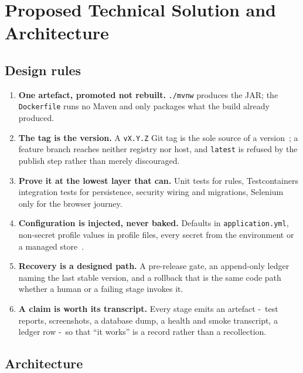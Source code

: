 \documentclass[10pt,a4paper]{article}
\begin{document}
\section{Proposed Technical Solution and Architecture}

\subsection{Design rules}
\begin{enumerate}[label=\textbf{R\arabic*.},leftmargin=2.3em]
  \item \textbf{One artefact, promoted not rebuilt.} \texttt{./mvnw} produces the JAR; the
        \texttt{Dockerfile} runs no Maven and only packages what the build already produced.
  \item \textbf{The tag is the version.} A \texttt{vX.Y.Z} Git tag is the sole source of a
        version~\cite{semver}; a feature branch reaches neither registry nor host, and
        \texttt{latest} is refused by the publish step rather than merely discouraged.
  \item \textbf{Prove it at the lowest layer that can.} Unit tests for rules, Testcontainers
        integration tests for persistence, security wiring and migrations, Selenium only for the
        browser journey.
  \item \textbf{Configuration is injected, never baked.} Defaults in \texttt{application.yml},
        non-secret profile values in profile files, every secret from the environment or a
        managed store~\cite{owasp2021}.
  \item \textbf{Recovery is a designed path.} A pre-release gate, an append-only ledger naming
        the last stable version, and a rollback that is the same code path whether a human or a
        failing stage invokes it.
  \item \textbf{A claim is worth its transcript.} Every stage emits an artefact -\ test
        reports, screenshots, a database dump, a health and smoke transcript, a ledger row
        -\ so that ``it works'' is a record rather than a recollection.
\end{enumerate}

\subsection{Architecture}
\end{document}
